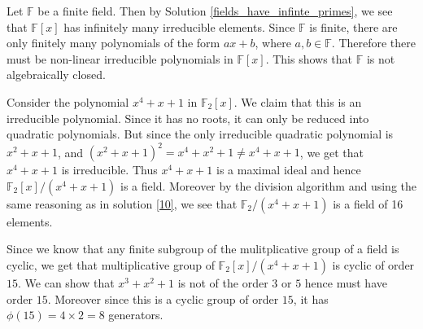 \documentclass[12pt]{exam}
\theoremstyle{plain} %
\theoremstyle{definition} %
\theoremstyle{remark} %
\begin{document}
\begin{questions}
\begin{solution}
  \end{solution}

  \question
  \begin{solution}
    Let $\mathbb{F}$  be a finite field. Then by
    Solution \ref{fields_have_infinte_primes}, we see that $\mathbb{F}[x]$
    has infinitely many irreducible elements. Since $\mathbb{F}$
    is finite, there are only finitely many polynomials of the form
    $ax + b$, where $a, b \in \mathbb{F}$. Therefore there must be
    non-linear irreducible polynomials in $\mathbb{F}[x]$. This shows
    that $\mathbb{F}$ is not algebraically closed.
  \end{solution}

  \question
  \begin{solution}
    Consider the polynomial $x^4 + x + 1$ in $\mathbb{F}_2[x]$. We
    claim that this is an irreducible polynomial. Since it has no
    roots, it can only be reduced into quadratic polynomials. But
    since the only irreducible quadratic polynomial is $x^2 + x + 1$,
    and $(x^2 + x +1)^2 = x^4 + x^2 +1 \neq x^4 + x +1$, we get that
    $x^4 + x + 1$ is irreducible. Thus $x^4 + x + 1$ is a maximal
    ideal and hence $\mathbb{F}_2[x]/(x^4 + x + 1)$ is a field.
    Moreover by the division algorithm and using the same reasoning
    as in solution \ref{10}, we see that $\mathbb{F}_2/(x^4 + x+1)$
    is a field of 16 elements.

    Since we know that any finite subgroup of the mulitplicative
    group of a field is cyclic, we get that multiplicative group of
    $\mathbb{F}_2[x]/(x^4 + x +1)$ is cyclic of order $15$. We can
    show that $x^3 + x^2 + 1$ is not of the order $3$ or $5$ hence
    must have order $15$. Moreover since this is a cyclic group of
    order $15$, it has $\phi(15) = 4 \times 2 = 8$ generators.
  \end{solution}

\end{questions}
\printbibliography[heading=bibintoc]
\end{document}
